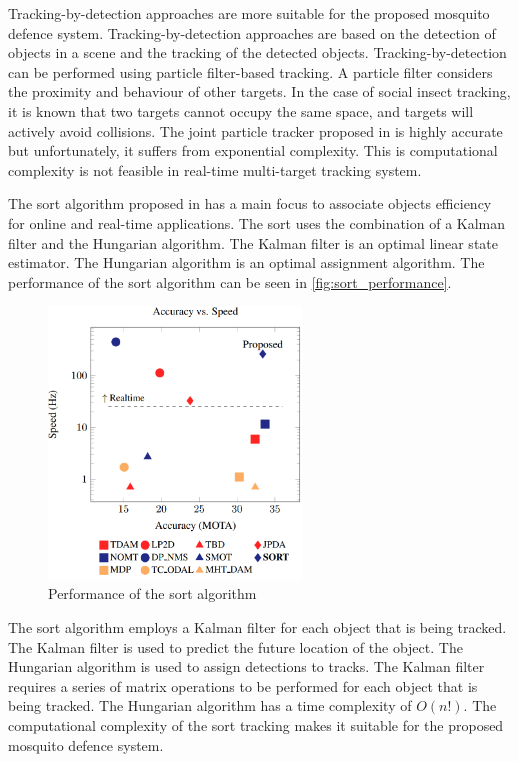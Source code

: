 Tracking-by-detection approaches are more suitable for the proposed mosquito defence system. Tracking-by-detection approaches are based on the detection of objects in a scene and the tracking of the detected objects. Tracking-by-detection can be performed using particle filter-based tracking. A particle filter considers the proximity and behaviour of other targets. In the case of social insect tracking, it is known that two targets cannot occupy the same space, and targets will actively avoid collisions. The joint particle tracker proposed in \cite{Khan2003} is highly accurate but unfortunately, it suffers from exponential complexity. This is computational complexity is not feasible in real-time multi-target tracking system.

The \gls{sort} algorithm proposed in \cite{SORT-Bewley2017} has a main focus to associate objects efficiency for online and real-time applications. The \gls{sort} uses the combination of a Kalman filter and the Hungarian algorithm. The Kalman filter is an optimal linear state estimator. The Hungarian algorithm is an optimal assignment algorithm. The performance of the \gls{sort} algorithm can be seen in \autoref{fig:sort_performance}.
\begin{figure}[h]
  \centering
  \includegraphics[width=0.6\textwidth]{figures/sort_performance.png}
  \caption{Performance of the \gls{sort} algorithm \cite{SORT-Bewley2017}}
  \label{fig:sort_performance}
\end{figure}
The \gls{sort} algorithm employs a Kalman filter for each object that is being tracked. The Kalman filter is used to predict the future location of the object. The Hungarian algorithm is used to assign detections to tracks. The Kalman filter requires a series of matrix operations to be performed for each object that is being tracked. The Hungarian algorithm has a time complexity of $O\left(n!\right)$. The computational complexity of the \gls{sort} tracking makes it suitable for the proposed mosquito defence system.

